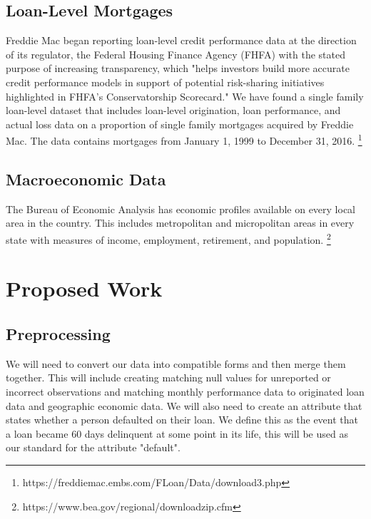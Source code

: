 \documentclass[sigconf, 11pt]{acmart}
\begin{document}
\subsection{Loan-Level Mortgages}
Freddie Mac began reporting loan-level credit performance data at the direction of its regulator, the Federal Housing Finance Agency (FHFA) with the stated purpose of increasing transparency, which "helps investors build more accurate credit performance models in support of potential risk-sharing initiatives highlighted in FHFA's Conservatorship Scorecard." We have found a single family loan-level dataset that includes loan-level origination, loan performance, and actual loss data on a proportion of single family mortgages acquired by Freddie Mac. The data contains mortgages from January 1, 1999 to December 31, 2016. \footnote{https://freddiemac.embs.com/FLoan/Data/download3.php}

\subsection{Macroeconomic Data}
The Bureau of Economic Analysis has economic profiles available on every local area in the country. This includes metropolitan and micropolitan areas in every state with measures of income, employment, retirement, and population. \footnote{https://www.bea.gov/regional/downloadzip.cfm}

\section{Proposed Work}
\subsection{Preprocessing}
We will need to convert our data into compatible forms and then merge them together. This will include creating matching null values for unreported or incorrect observations and matching monthly performance data to originated loan data and geographic economic data. We will also need to create an attribute that states whether a person defaulted on their loan. We define this as the event that a loan became 60 days delinquent at some point in its life, this will be used as our standard for the attribute "default".
\end{document}
